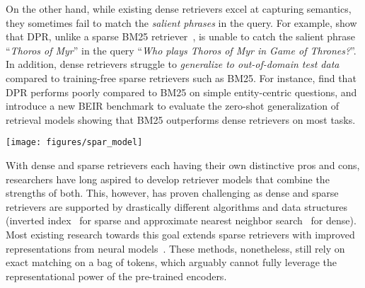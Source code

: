 \documentclass[11pt]{article}
\newcommand{\spar}{\texttt{SPAR}\xspace}
\newcommand{\lexmodel}{Lexical Model}
\newcommand{\lexmodelsymbol}{\xspace}
\begin{document}
On the other hand, while existing dense retrievers excel at capturing semantics, they sometimes fail to match the \emph{salient phrases} in the query.
For example, \citet{karpukhin-etal-2020-dense} show that DPR, unlike a sparse BM25 retriever~\cite{bm25}, is unable to catch the salient phrase ``\emph{Thoros of Myr}'' in the query ``\emph{Who plays Thoros of Myr in Game of Thrones?}''.
In addition, dense retrievers struggle to \emph{generalize to out-of-domain test data} compared to training-free sparse retrievers such as BM25.
For instance, \citet{sciavolino2021simple} find that DPR performs poorly compared to BM25 on simple entity-centric questions, and \citet{thakur2021beir} introduce a new BEIR benchmark to evaluate the zero-shot generalization of retrieval models showing that BM25 outperforms dense retrievers on most tasks.


\begin{figure*}[ht]
    \centering
    \texttt{[image: figures/spar\_model]}
    \caption{\spar{} augments a dense retriever with a dense \lexmodel{} \lexmodelsymbol{} trained to imitate a sparse teacher retriever. \lexmodelsymbol{} is trained using random sentences as queries with positive and negative passages produced by the teacher. \lexmodelsymbol{} is then combined with a dense retriever via vector concatenation to form a salient-phrase aware retriever.}
    \label{fig:spar_model}
\end{figure*}

With dense and sparse retrievers each having their own distinctive pros and cons, researchers have long aspired to develop retriever models that combine the strengths of both.
This, however, has proven challenging as dense and sparse retrievers are supported by drastically different algorithms and data structures (inverted index~\cite{bialecki2012apache} for sparse and approximate nearest neighbor search~\cite{faiss} for dense).
Most existing research towards this goal extends sparse retrievers with improved representations from neural models~\cite{lin2021brief}.
These methods, nonetheless, still rely on exact matching on a bag of tokens, which arguably cannot fully leverage the representational power of the pre-trained encoders.
\end{document}
